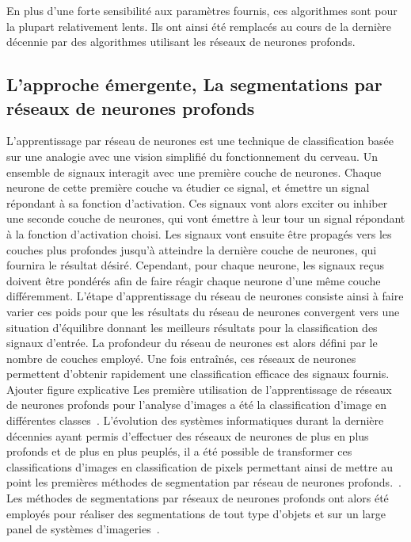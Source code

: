\documentclass[\main/main.tex]{subfiles}
\begin{document}
%
En plus d'une forte sensibilité aux paramètres fournis, ces algorithmes sont pour la plupart relativement lents.
%
Ils ont ainsi été remplacés au cours de la dernière décennie par des algorithmes utilisant les réseaux de neurones profonds.

    \subsection{L'approche émergente, La segmentations par réseaux de neurones profonds}

%
L'apprentissage par réseau de neurones est une technique de classification basée sur une analogie avec une vision simplifié du fonctionnement du cerveau.
%
Un ensemble de signaux interagit avec une première couche de neurones.
%
Chaque neurone de cette première couche va étudier ce signal, et émettre un signal répondant à sa fonction d'activation.
%
Ces signaux vont alors exciter ou inhiber une seconde couche de neurones, qui vont émettre à leur tour un signal répondant à la fonction d'activation choisi.
%
Les signaux vont ensuite être propagés vers les couches plus profondes jusqu'à atteindre la dernière couche de neurones, qui fournira le résultat désiré.
%
Cependant, pour chaque neurone, les signaux reçus doivent être pondérés afin de faire réagir chaque neurone d'une même couche différemment.
%
L'étape d'apprentissage du réseau de neurones consiste ainsi à faire varier ces poids pour que les résultats du réseau de neurones convergent vers une situation d'équilibre donnant les meilleurs résultats pour la classification des signaux d'entrée.
%
La profondeur du réseau de neurones est alors défini par le nombre de couches employé.
%
Une fois entraînés, ces réseaux de neurones permettent d'obtenir rapidement une classification efficace des signaux fournis.
\color{magenta}Ajouter figure explicative\color{black}
%
Les première utilisation de l'apprentissage de réseaux de neurones profonds pour l'analyse d'images a été la classification d'image en différentes classes~\cite{lecun_1989,krizhevsky_2017,Simonyan_2014}.
%
L'évolution des systèmes informatiques durant la dernière décennies ayant permis d'effectuer des réseaux de neurones de plus en plus profonds et de plus en plus peuplés, il a été possible de transformer ces classifications d'images en classification de pixels permettant ainsi de mettre au point les premières méthodes de segmentation par réseau de neurones profonds.~\cite{ronneberger_2015,milletari_2016}.
%
Les méthodes de segmentations par réseaux de neurones profonds ont alors été employés pour réaliser des segmentations de tout type d'objets et sur un large panel de systèmes d'imageries~\cite{zhao_2019,xie_2020,xu_2020,zhang_2020,khan_2020,zhang_2019a}.
\end{document}
